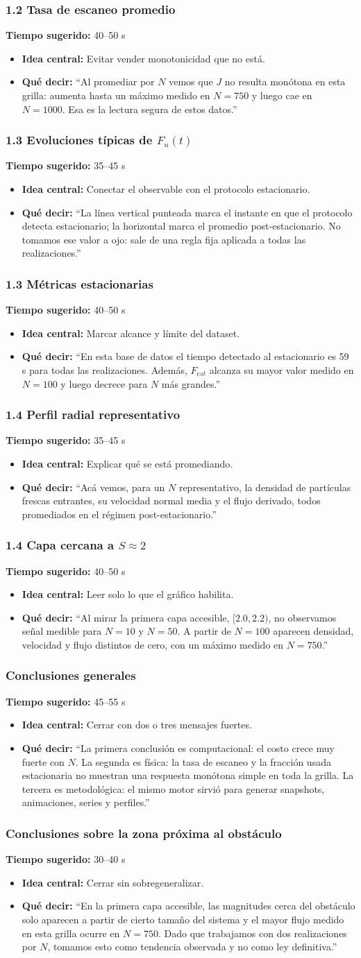 \documentclass[11pt]{article}
\newcommand{\slideguide}[4]{
  \subsubsection*{#1}
  \textbf{Tiempo sugerido:} #2
  \begin{itemize}
    \item \textbf{Idea central:} #3
    \item \textbf{Qu\'e decir:} #4
  \end{itemize}
}
\begin{document}
\slideguide{1.2 Tasa de escaneo promedio}{40--50 s}{Evitar vender monotonicidad que no est\'a.}{``Al promediar por $N$ vemos que $J$ no resulta mon\'otona en esta grilla: aumenta hasta un m\'aximo medido en $N=750$ y luego cae en $N=1000$. Esa es la lectura segura de estos datos.''}

\slideguide{1.3 Evoluciones t\'ipicas de $F_u(t)$}{35--45 s}{Conectar el observable con el protocolo estacionario.}{``La l\'inea vertical punteada marca el instante en que el protocolo detecta estacionario; la horizontal marca el promedio post-estacionario. No tomamos ese valor a ojo: sale de una regla fija aplicada a todas las realizaciones.''}

\slideguide{1.3 M\'etricas estacionarias}{40--50 s}{Marcar alcance y l\'imite del dataset.}{``En esta base de datos el tiempo detectado al estacionario es 59 s para todas las realizaciones. Adem\'as, $F_{est}$ alcanza su mayor valor medido en $N=100$ y luego decrece para $N$ m\'as grandes.''}

\slideguide{1.4 Perfil radial representativo}{35--45 s}{Explicar qu\'e se est\'a promediando.}{``Ac\'a vemos, para un $N$ representativo, la densidad de part\'iculas frescas entrantes, su velocidad normal media y el flujo derivado, todos promediados en el r\'egimen post-estacionario.''}

\slideguide{1.4 Capa cercana a $S \approx 2$}{40--50 s}{Leer solo lo que el gr\'afico habilita.}{``Al mirar la primera capa accesible, $[2.0,2.2)$, no observamos se\~nal medible para $N=10$ y $N=50$. A partir de $N=100$ aparecen densidad, velocidad y flujo distintos de cero, con un m\'aximo medido en $N=750$.''}

\slideguide{Conclusiones generales}{45--55 s}{Cerrar con dos o tres mensajes fuertes.}{``La primera conclusi\'on es computacional: el costo crece muy fuerte con $N$. La segunda es f\'isica: la tasa de escaneo y la fracci\'on usada estacionaria no muestran una respuesta mon\'otona simple en toda la grilla. La tercera es metodol\'ogica: el mismo motor sirvi\'o para generar snapshots, animaciones, series y perfiles.''}

\slideguide{Conclusiones sobre la zona pr\'oxima al obst\'aculo}{30--40 s}{Cerrar sin sobregeneralizar.}{``En la primera capa accesible, las magnitudes cerca del obst\'aculo solo aparecen a partir de cierto tama\~no del sistema y el mayor flujo medido en esta grilla ocurre en $N=750$. Dado que trabajamos con dos realizaciones por $N$, tomamos esto como tendencia observada y no como ley definitiva.''}
\end{document}
